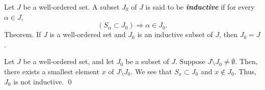 \documentclass[a4paper,12pt]{article}
\begin{document}
\begin{exe}
	Let \( J \) be a well-ordered set.
	A subset \( J_0 \) of \( J \) is said to be \textbf{\textit{inductive}}
	if for every \( \alpha \in J \),
	\begin{equation*}
		(S_{\alpha} \subset J_0) \Rightarrow \alpha \in J_0.
	\end{equation*}
	Theorem.\;
	If \( J \) is a well-ordered set and \( J_0 \) is an inductive subset of \( J \),
	then \( J_0=J \).
\end{exe}
\begin{sol}
	Let \( J \) be a well-ordered set,
	and let \( J_0 \) be a subset of \( J \).
	Suppose \( J \setminus J_0  \neq \emptyset \).
	Then, there exists a smallest element \( x \) of \( J \setminus J_0 \).
	We see that
	\( S_x \subset J_0 \)
	and
	\( x \notin J_0 \).
	Thus, \( J_0 \) is not inductive.
	\qed\end{sol}
\end{document}
